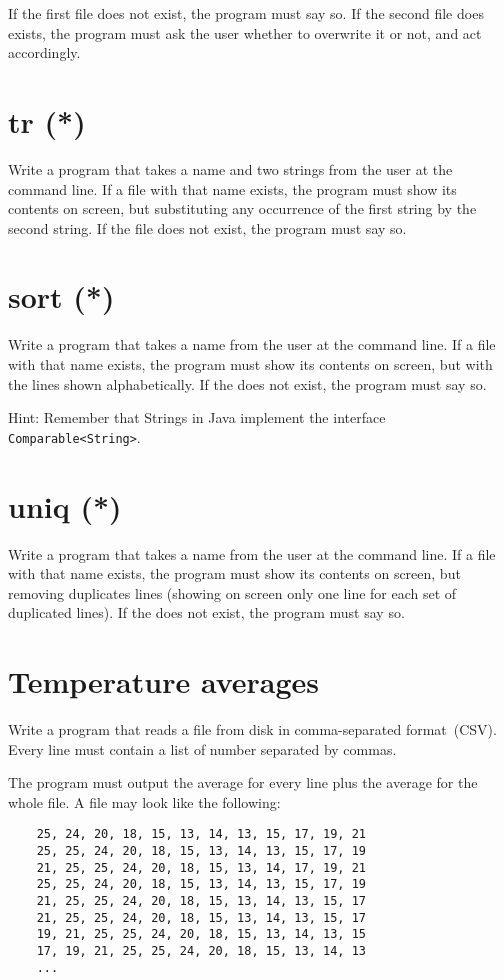 \documentclass{article}
\begin{document}
If the first file does not exist, the program must say so. If the
second file does exists, the program must ask the user whether to
overwrite it or not, and act accordingly.

\section{tr (*)}
\label{sec:tr}

Write a program that takes a name and two strings from the user at the
command line. If a file with that name exists, the program must show
its contents on screen, but substituting any occurrence of the first
string by the second string. If the file does not exist, the program
must say so.

\section{sort (*)}
\label{sec:sort-}

Write a program that takes a name from the user at the command
line. If a file with that name exists, the program must show its
contents on screen, but with the lines shown alphabetically. If the
does not exist, the program must say so. 

Hint: Remember that Strings in Java implement the interface
\verb+Comparable<String>+. 

\section{uniq (*)}
\label{sec:uniq-}

Write a program that takes a name from the user at the command
line. If a file with that name exists, the program must show its
contents on screen, but removing duplicates lines (showing on screen 
only one line for each set of duplicated lines). If the
does not exist, the program must say so. 

\section{Temperature averages}
\label{sec:temperature-averages}

Write a program that reads a file from disk in comma-separated
format~(CSV). Every line must contain a list of number separated by
commas. 

The program must output the average for every line plus the average
for the whole file. A file may look like the following: 

\begin{verbatim}
    25, 24, 20, 18, 15, 13, 14, 13, 15, 17, 19, 21 
    25, 25, 24, 20, 18, 15, 13, 14, 13, 15, 17, 19 
    21, 25, 25, 24, 20, 18, 15, 13, 14, 17, 19, 21 
    25, 25, 24, 20, 18, 15, 13, 14, 13, 15, 17, 19 
    21, 25, 25, 24, 20, 18, 15, 13, 14, 13, 15, 17 
    21, 25, 25, 24, 20, 18, 15, 13, 14, 13, 15, 17 
    19, 21, 25, 25, 24, 20, 18, 15, 13, 14, 13, 15 
    17, 19, 21, 25, 25, 24, 20, 18, 15, 13, 14, 13
    ...
\end{verbatim}
\end{document}
